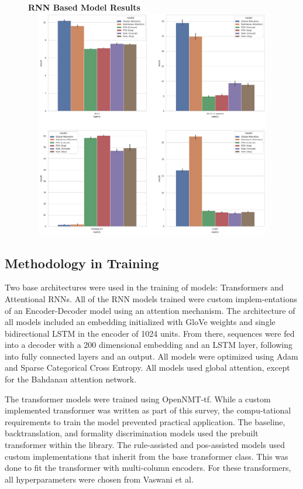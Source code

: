 \documentclass[12pt]{article}
\begin{document}
\begin{figure}[ht]
    \centering
    \textbf{RNN Based Model Results}
    \includegraphics[width=12cm, height=10cm]{RNN-plots.png}
\end{figure}

\subsection{Methodology in Training}
Two base architectures were used in the training of models: Transformers and Attentional RNNs. 
All of the RNN models trained were custom implem-entations of an Encoder-Decoder model using 
an attention mechanism. The architecture of all models included an embedding initialized with GloVe weights 
and single bidirectional LSTM in the encoder of 1024 units. From there, sequences were fed into 
a decoder with a 200 dimensional embedding and an LSTM layer, following into fully connected layers
and an output. All models were optimized using Adam and Sparse Categorical Cross Entropy. All models
used global attention, except for the Bahdanau attention network. \par

The transformer models were trained using OpenNMT-tf. While a custom implemented transformer
was written as part of this survey, the compu-tational requirements to train the model prevented 
practical application. The baseline, backtranslation, and formality discrimination
models used the prebuilt transformer within the library. The rule-assisted and pos-assisted models
used custom implementations that inherit from the base transformer class. This was done to fit 
the transformer with multi-column encoders. For these transformers, all hyperparameters were 
chosen from Vaswani et al.~\cite{AAYN}
\end{document}
